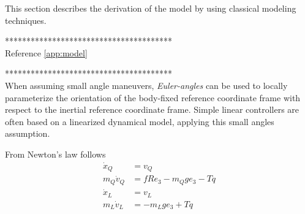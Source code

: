 This section describes the derivation of the model by using classical modeling techniques.

***************************************\\
Reference \ref{app:model}

***************************************\\

When assuming small angle maneuvers, \textit{Euler-angles} can be used to locally parameterize the orientation of the body-fixed reference coordinate frame with respect to the inertial reference coordinate frame. Simple linear controllers are often based on a linearized dynamical model, applying this small angles assumption. 

From Newton's law follows
\begin{equation}\label{eq:newton}
\begin{aligned}
\dot{x}_Q &= v_Q\\
m_Q\dot{v}_Q &=fRe_3-m_Qge_3-Tq\\
\dot{x}_L &= v_L\\
m_L\dot{v}_L &=-m_Lge_3+Tq
\end{aligned}
\end{equation}


